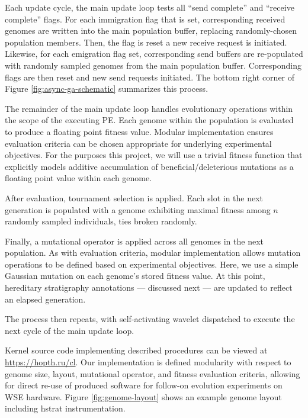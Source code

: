 Each update cycle, the main update loop tests all ``send complete'' and ``receive complete'' flags.
For each immigration flag that is set, corresponding received genomes are written into the main population buffer, replacing randomly-chosen population members.
Then, the flag is reset a new receive request is initiated.
Likewise, for each emigration flag set, corresponding send buffers are re-populated with randomly sampled genomes from the main population buffer.
Corresponding flags are then reset and new send requests initiated.
The bottom right corner of Figure \ref{fig:async-ga-schematic} summarizes this process.

The remainder of the main update loop handles evolutionary operations within the scope of the executing PE.
Each genome within the population is evaluated to produce a floating point fitness value.
Modular implementation ensures evaluation criteria can be chosen appropriate for underlying experimental objectives.
For the purposes this project, we will use a trivial fitness function that explicitly models additive accumulation of beneficial/deleterious mutations as a floating point value within each genome.

After evaluation, tournament selection is applied.
Each slot in the next generation is populated with a genome exhibiting maximal fitness among $n$ randomly sampled individuals, ties broken randomly.

Finally, a mutational operator is applied across all genomes in the next population.
As with evaluation criteria, modular implementation allows mutation operations to be defined based on experimental objectives.
Here, we use a simple Gaussian mutation on each genome's stored fitness value.
At this point, hereditary stratigraphy annotations --- discussed next --- are updated to reflect an elapsed generation.

The process then repeats, with self-activating wavelet dispatched to execute the next cycle of the main update loop.



Kernel source code implementing described procedures can be viewed at \url{https://hopth.ru/cl}.
Our implementation is defined modularity with respect to genome size, layout, mutational operator, and fitness evaluation criteria, allowing for direct re-use of produced software for follow-on evolution experiments on WSE hardware.
Figure \ref{fig:genome-layout} shows an example genome layout including hstrat instrumentation.


